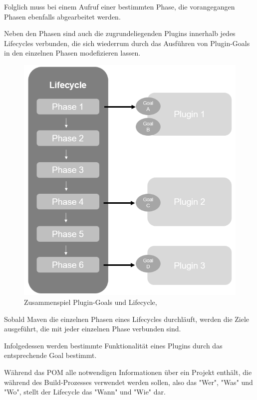 Folglich muss bei einem Aufruf einer bestimmten Phase, die vorangegangen Phasen ebenfalls abgearbeitet werden. 

Neben den Phasen sind auch die zugrundeliegenden Plugins innerhalb jedes Lifecycles verbunden, die sich wiederrum durch das Ausführen von Plugin-Goals in den einzelnen Phasen modefizieren lassen. \cite[S. 71]{spiller_maven_2011}

\begin{figure}[h]
    \centering
    \includegraphics[scale=0.6]{Bilder/lifecycle_maven.png}
    \caption{Zusammenspiel Plugin-Goals und Lifecycle, \cite[S. 59]{varanasi_introducing_2019}}
\end{figure}

Sobald Maven die einzelnen Phasen eines Lifecycles durchläuft, werden die Ziele ausgeführt, die mit jeder einzelnen Phase verbunden sind. \cite[S. 39]{loukides_maven_2008} 

Infolgedessen werden bestimmte Funktionalität eines Plugins durch das entsprechende Goal bestimmt. 

Während das POM alle notwendigen Informationen über ein Projekt enthält, die während des Build-Prozesses verwendet werden sollen, also das "Wer", "Was" und "Wo", stellt der Lifecycle das "Wann" und "Wie" dar. \cite{the_apache_software_foundation_maven_2002}

